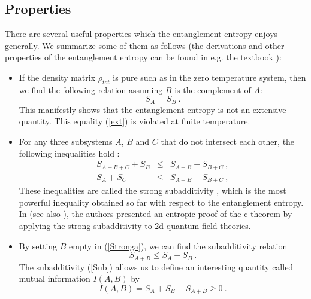 \documentclass[12pt]{article}
\def\be{\begin{equation}}
\def\ee{\end{equation}}
\begin{document}
\subsection{Properties}
\label{prop EE}
\hspace{5mm} There are several useful properties which
the entanglement entropy enjoys generally.
We summarize some of them as follows (the derivations and other properties of
the entanglement entropy can be found in e.g. the textbook \cite{Nielsen-Chuang00}):
\begin{itemize}
\item If the density matrix $\rho_{tot}$ is pure such as in the zero temperature system, then
we find the following relation assuming $B$ is the complement of $A$:
\be S_A=S_B\ . \label{ext}
              \ee
        This manifestly shows that the entanglement
        entropy is not an extensive quantity.
              This equality (\ref{ext}) is violated
              at finite temperature.

\item
For any three subsystems $A$, $B$ and $C$
that do not intersect each other,
the following inequalities hold :
\begin{eqnarray}
 S_{A+B+C} + S_{B} &\le& S_{A+B}+S_{B+C} \ ,  \label{Stronga}\\
 S_{A} + S_{C} &\le& S_{A+B}+S_{B+C} \ , \label{Strongb}
\end{eqnarray}
These inequalities are called the strong subadditivity \cite{LiRu}, which is the most powerful
inequality obtained so far with respect to the entanglement entropy.
In \cite{Casinicth,Casini:2006es} (see also \cite{Casiniarea}), the authors
presented an entropic proof of the c-theorem by applying the strong subadditivity to 2d quantum field theories.

\item By setting $B$ empty in (\ref{Stronga}), we can find the subadditivity relation
\be
 S_{A+B}\le S_{A}+S_{B} \ . \label{Sub}
\ee
The subadditivity (\ref{Sub}) allows us to define an interesting quantity called mutual information
$I(A,B)$ by
\be
I(A,B)=S_A+S_B-S_{A+B}\geq 0 \ .
\ee

\end{itemize}
\end{document}
